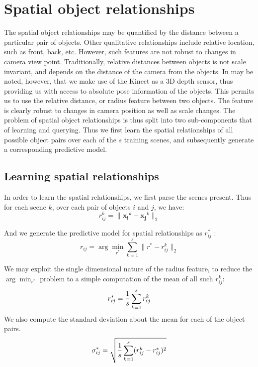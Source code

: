 \section{Spatial object relationships}
The spatial object relationships may be quantified by the distance between a particular pair of objects. Other qualitative relationships include relative location, such as front, back, etc. However, such features are not robust to changes in camera view point. Traditionally, relative distances between objects is not scale invariant, and depends on the distance of the camera from the objects. In may be noted, however, that we make use of the Kinect as a 3D depth sensor, thus providing us with access to absolute pose information of the objects. This permits us to use the relative distance, or radius feature between two objects. The feature is clearly robust to changes in camera position as well as scale changes. The problem of spatial object relationships is thus split into two sub-components that of learning and querying. Thus we first learn the spatial relationships of all possible object pairs over each of the $s$ training scenes, and subsequently generate a corresponding predictive model. 

\subsection{Learning spatial relationships}
In order to learn the spatial relationships, we first parse the scenes present. Thus for each scene $k$, over each pair of objects $i$ and $j$, we have:
\begin{equation}
r_{ij}^{k} = \| \mathbf{x_i}^k - \mathbf{x_j}^k \| _2 
\end{equation}


And we generate the predictive model for spatial relationships as $r_{ij}^*$ : 
\begin{equation}
r_{ij} = \arg\min_{r^*} \sum_{k=1}^s \| r^* - r_{ij}^{k}  \| _2
\end{equation}


We may exploit the single dimensional nature of the radius feature, to reduce the $\arg\min_{r^*}$ problem to a simple computation of the mean of all such $r_{ij}^k$:
\begin{equation}
r_{ij}^* = {1\over{s}} \sum_{k=1}^s r_{ij}^k 
\end{equation}
We also compute the standard deviation about the mean for each of the object pairs. 
\begin{equation}
\sigma_{ij}^* = \sqrt{{1 \over s} \sum_{k=1}^s (r_{ij}^k - r_{ij}^*)^2}
\end{equation}

